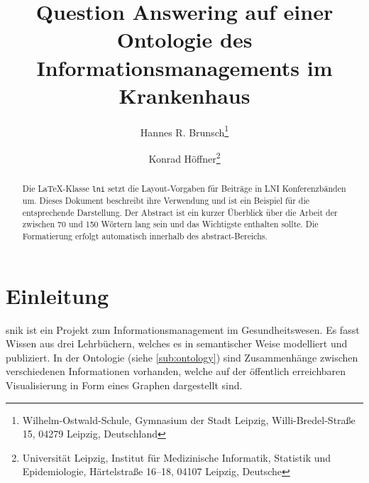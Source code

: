 \documentclass[utf8,biblatex]{lni}
\begin{document}
\title[Question Answering auf SNIK]{Question Answering auf einer Ontologie des Informationsmanagements im Krankenhaus}
\author[Hannes R. Brunsch \and Konrad Höffner]
{Hannes R. Brunsch\footnote{Wilhelm-Ostwald-Schule, Gymnasium der Stadt Leipzig, Willi-Bredel-Straße 15, 04279 Leipzig, Deutschland } \and
 Konrad Höffner\footnote{Universität Leipzig, Institut für Medizinische Informatik, Statistik und Epidemiologie, Härtelstraße 16--18, 04107 Leipzig, Deutsche }}
\maketitle

\begin{abstract}
Die \LaTeX-Klasse \texttt{lni} setzt die Layout-Vorgaben für Beiträge in LNI Konferenzbänden um.
Dieses Dokument beschreibt ihre Verwendung und ist ein Beispiel für die entsprechende Darstellung.
Der Abstract ist ein kurzer Überblick über die Arbeit der zwischen 70 und 150 Wörtern lang sein und das Wichtigste enthalten sollte.
Die Formatierung erfolgt automatisch innerhalb des abstract-Bereichs.
\end{abstract}




\section{Einleitung}

\ac{snik} ist ein Projekt zum Informationsmanagement im Gesundheitswesen.
Es fasst Wissen aus drei Lehrbüchern, welches es in semantischer Weise modelliert und publiziert.
In der Ontologie (siehe \cref{sub:ontology}) sind Zusammenhänge zwischen verschiedenen Informationen vorhanden,
welche auf der öffentlich erreichbaren Visualisierung in Form eines Graphen dargestellt sind.
\end{document}
